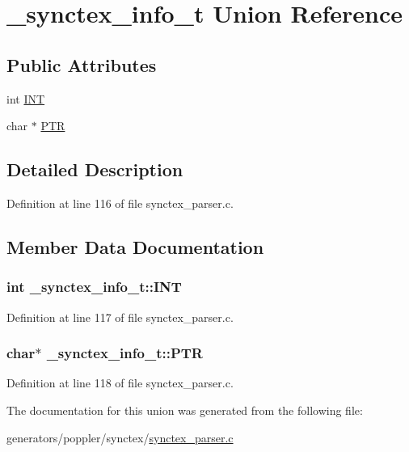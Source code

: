 \hypertarget{union__synctex__info__t}{\section{\+\_\+synctex\+\_\+info\+\_\+t Union Reference}
\label{union__synctex__info__t}
}
\subsection*{Public Attributes}
\begin{DoxyCompactItemize}
\item 
int \hyperlink{union__synctex__info__t_a4c2a281dcceec2d9ef8c47d31d91144f}{I\+N\+T}
\item 
char $\ast$ \hyperlink{union__synctex__info__t_a21f6dc493ca32c32112f6bba2aa5e491}{P\+T\+R}
\end{DoxyCompactItemize}


\subsection{Detailed Description}


Definition at line 116 of file synctex\+\_\+parser.\+c.



\subsection{Member Data Documentation}
\hypertarget{union__synctex__info__t_a4c2a281dcceec2d9ef8c47d31d91144f}{
\subsubsection[{I\+N\+T}]{\setlength{\rightskip}{0pt plus 5cm}int \+\_\+synctex\+\_\+info\+\_\+t\+::\+I\+N\+T}}\label{union__synctex__info__t_a4c2a281dcceec2d9ef8c47d31d91144f}


Definition at line 117 of file synctex\+\_\+parser.\+c.

\hypertarget{union__synctex__info__t_a21f6dc493ca32c32112f6bba2aa5e491}{
\subsubsection[{P\+T\+R}]{\setlength{\rightskip}{0pt plus 5cm}char$\ast$ \+\_\+synctex\+\_\+info\+\_\+t\+::\+P\+T\+R}}\label{union__synctex__info__t_a21f6dc493ca32c32112f6bba2aa5e491}


Definition at line 118 of file synctex\+\_\+parser.\+c.



The documentation for this union was generated from the following file\+:\begin{DoxyCompactItemize}
\item 
generators/poppler/synctex/\hyperlink{synctex__parser_8c}{synctex\+\_\+parser.\+c}\end{DoxyCompactItemize}
